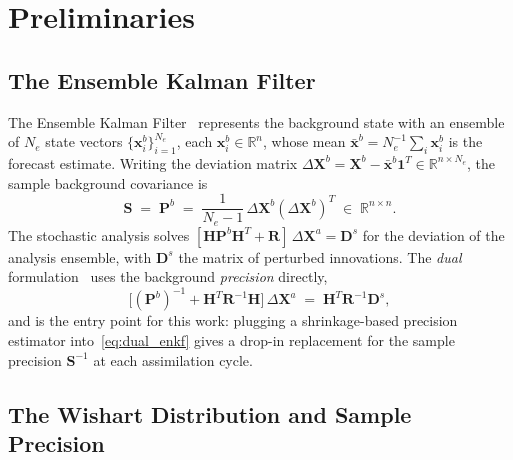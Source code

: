 \section{Preliminaries}
\label{sec:preliminaries}

\subsection{The Ensemble Kalman Filter}
\label{sec:enkf}

The Ensemble Kalman Filter~\cite{evensen2003ensemble} represents the background state with an ensemble of $N_e$ state vectors $\{\mathbf{x}_i^b\}_{i=1}^{N_e}$, each $\mathbf{x}_i^b \in \mathbb{R}^n$, whose mean $\bar{\mathbf{x}}^b = N_e^{-1}\sum_i \mathbf{x}_i^b$ is the forecast estimate. Writing the deviation matrix $\Delta\mathbf{X}^b = \mathbf{X}^b - \bar{\mathbf{x}}^b\mathbf{1}^T \in \mathbb{R}^{n \times N_e}$, the sample background covariance is
\begin{equation}
\label{eq:sample_cov}
\mathbf{S} \;=\; \mathbf{P}^b \;=\; \frac{1}{N_e - 1}\,\Delta\mathbf{X}^b (\Delta\mathbf{X}^b)^T \;\in\; \mathbb{R}^{n \times n}.
\end{equation}
The stochastic analysis solves $[\mathbf{H}\mathbf{P}^b\mathbf{H}^T + \mathbf{R}]\,\Delta\mathbf{X}^a = \mathbf{D}^s$ for the deviation of the analysis ensemble, with $\mathbf{D}^s$ the matrix of perturbed innovations. The \emph{dual} formulation~\cite{nino2018ensemble} uses the background \emph{precision} directly,
\begin{equation}
\label{eq:dual_enkf}
\bigl[(\mathbf{P}^b)^{-1} + \mathbf{H}^T\mathbf{R}^{-1}\mathbf{H}\bigr]\,\Delta\mathbf{X}^a \;=\; \mathbf{H}^T\mathbf{R}^{-1}\mathbf{D}^s,
\end{equation}
and is the entry point for this work: plugging a shrinkage-based precision estimator into~\eqref{eq:dual_enkf} gives a drop-in replacement for the sample precision $\mathbf{S}^{-1}$ at each assimilation cycle.

\subsection{The Wishart Distribution and Sample Precision}
\label{sec:wishart}

